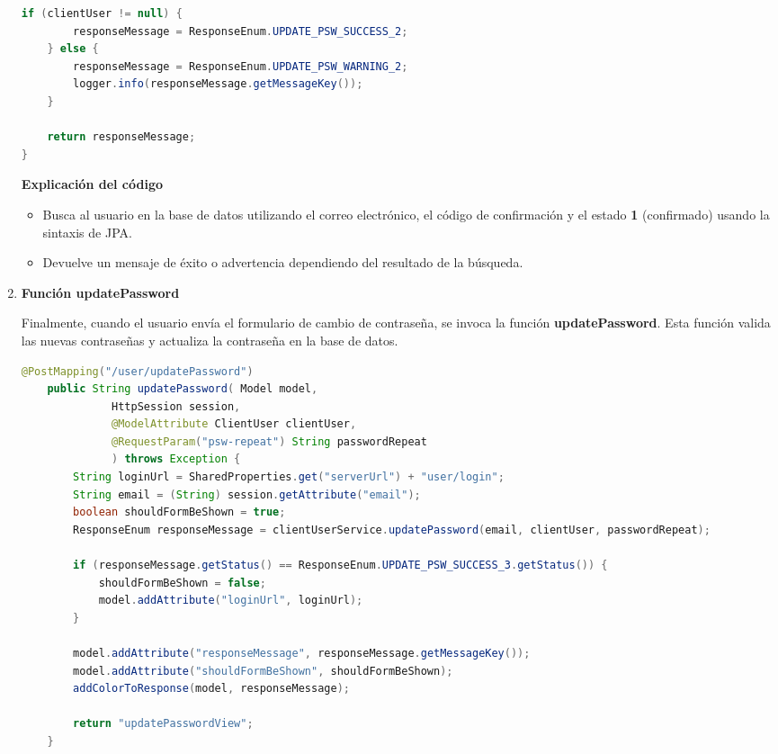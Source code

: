 \documentclass[draft]{scrbook}
\begin{document}
\begin{enumerate}
\begin{lstlisting}[language=Java]
    if (clientUser != null) {
        responseMessage = ResponseEnum.UPDATE_PSW_SUCCESS_2;
    } else {
        responseMessage = ResponseEnum.UPDATE_PSW_WARNING_2;
        logger.info(responseMessage.getMessageKey());
    }
    
    return responseMessage;
}
\end{lstlisting}

\textbf{Explicación del código}
\begin{itemize}
    \item Busca al usuario en la base de datos utilizando el correo electrónico, el código de confirmación y el estado \textbf{1} (confirmado) usando la sintaxis de JPA.
    \item Devuelve un mensaje de éxito o advertencia dependiendo del resultado de la búsqueda.
\end{itemize}

    \item \textbf{Función updatePassword}

Finalmente, cuando el usuario envía el formulario de cambio de contraseña, se invoca la función \textbf{updatePassword}. Esta función valida las nuevas contraseñas y actualiza la contraseña en la base de datos.

\begin{lstlisting}[language=Java]
@PostMapping("/user/updatePassword")
    public String updatePassword( Model model,
              HttpSession session,
              @ModelAttribute ClientUser clientUser,
              @RequestParam("psw-repeat") String passwordRepeat
              ) throws Exception {
        String loginUrl = SharedProperties.get("serverUrl") + "user/login";
        String email = (String) session.getAttribute("email");
        boolean shouldFormBeShown = true;
        ResponseEnum responseMessage = clientUserService.updatePassword(email, clientUser, passwordRepeat);
    	
        if (responseMessage.getStatus() == ResponseEnum.UPDATE_PSW_SUCCESS_3.getStatus()) {
            shouldFormBeShown = false;
            model.addAttribute("loginUrl", loginUrl);
        } 
    	
        model.addAttribute("responseMessage", responseMessage.getMessageKey());
        model.addAttribute("shouldFormBeShown", shouldFormBeShown);
        addColorToResponse(model, responseMessage);
        
        return "updatePasswordView";
    }
\end{lstlisting}


\end{enumerate}
\end{document}
